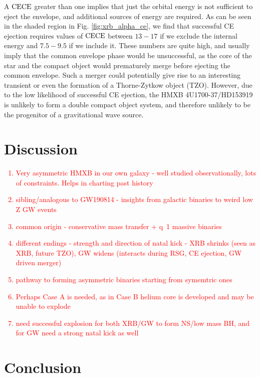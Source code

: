 \documentclass[linenumbers,trackchanges,twocolumn]{aastex701}
\newcommand{\red}{\textcolor{red}}
\begin{document}
 A $\alpha_{\rm CE}$ greater than one implies that just the orbital energy is not sufficient to eject the envelope, and additional sources of energy are required. As can be seen in the shaded region in Fig. \ref{fig:xrb_alpha_ce}, we find that successful CE ejection requires values of $\alpha_{\rm CE}$ between $13-17$ if we exclude the internal energy and $7.5-9.5$ if we include it. These numbers are quite high, and usually imply that the common envelope phase would be unsuccessful, as the core of the star and the compact object would prematurely merge before ejecting the common envelope. Such a merger could potentially give rise to an interesting transient or even the formation of a Thorne-Zytkow object (TZO). However, due to the low likelihood of successful CE ejection, the HMXB 4U1700-37/HD153919 is unlikely to form a double compact object system, and therefore unlikely to be the progenitor of a gravitational wave source.

\section{Discussion} \label{sec:highlight}

\red{
\begin{enumerate}
    \item Very asymmetric HMXB in our own galaxy - well studied observationally, lots of constraints. Helps in charting past history
    \item sibling/analogous to GW190814 - insights from galactic binaries to weird low Z GW events
    \item common origin - conservative mass transfer + q~1 massive binaries
    \item different endings - strength and direction of natal kick - XRB shrinks (seen as XRB, future TZO), GW widens (interacts during RSG, CE ejection, GW driven merger)
    \item pathway to forming asymmetric binaries starting from symemtric ones
    \item Perhaps Case A is needed, as in Case B helium core is developed and may be unable to explode
    \item need successful explosion for both XRB/GW to form NS/low mass BH, and for GW need a strong natal kick as well
\end{enumerate}
}

\section{Conclusion} \label{sec:cite}
\end{document}

